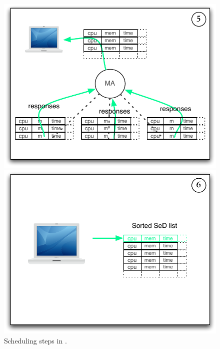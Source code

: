 \begin{figure}[h]
\begin{minipage}{\schdlFigWidth}
    \includegraphics[width=\schdlFigWidth]{fig/schdl04}
  \end{minipage}
  \begin{minipage}{\schdlFigWidth}
    \includegraphics[width=\schdlFigWidth]{fig/schdl05}
  \end{minipage}
  \caption{Scheduling steps in \diet.\label{scheduleSteps}}
\end{figure}

